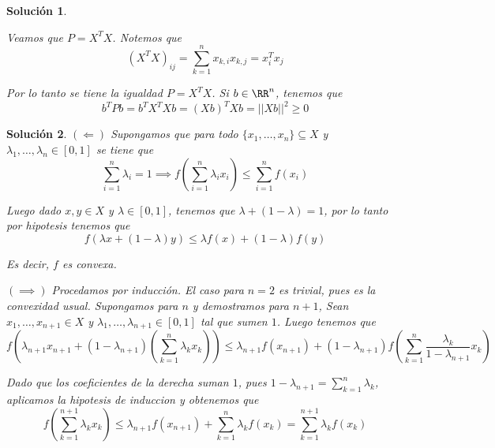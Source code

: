 \documentclass[a4paper,oneside,10.5pt]{USMArt}
\newtheorem{sol}{Soluci\'on}
\begin{document}
\begin{sol}
\begin{enumerate}
          Veamos que $P = X^TX$. Notemos que
          \begin{equation*}
            (X^{T}X)_{ij} = \sum_{k = 1}^n x_{k,i} x_{k,j} = x_{i}^T x_j
          \end{equation*}

          Por lo tanto se tiene la igualdad $P = X^TX$. Si $b \in \RR^n$, tenemos que
          \begin{equation*}
            b^TPb = b^TX^TXb =(Xb)^TXb = ||Xb||^2 \geq 0
          \end{equation*}
  \end{enumerate}
\end{sol}

\begin{sol}
  $(\Leftarrow)$ Supongamos que para todo $\{x_{1}, \dots, x_{n}\} \subseteq X$ y $\lambda_{1}, \dots, \lambda_{n} \in [0, 1]$ se tiene que
  \begin{equation*}
    \sum_{i = 1}^{n} \lambda_{i} = 1 \implies f(\sum_{i = 1}^{n} \lambda_{i} x_{i}) \leq \sum_{i = 1}^{n} f(x_{i})
  \end{equation*}

  Luego dado $x, y \in X$ y $\lambda \in [0,1]$, tenemos que $\lambda + (1 - \lambda) = 1$, por lo tanto por hipotesis
  tenemos que
  \begin{equation*}
    f(\lambda x + (1 - \lambda) y) \leq \lambda f(x) + (1 - \lambda) f(y)
  \end{equation*}

  Es decir, $f$ es convexa.

  $(\implies)$ Procedamos por inducción. El caso para $n = 2$ es trivial, pues es la convexidad usual. Supongamos para
  $n$ y demostramos para $n + 1$, Sean $x_{1}, \dots, x_{n + 1} \in X$ y $\lambda_{1}, \dots, \lambda_{n + 1} \in [0, 1]$
  tal que sumen $1$. Luego tenemos que
  \begin{equation*}
    f(\lambda_{n + 1} x_{n +1} + (1 - \lambda_{n + 1})(\sum_{k = 1}^{n} \lambda_{k} x_{k})) \leq \lambda_{n + 1}f(x_{n+1}) + (1 - \lambda_{n + 1}) f(\sum_{k = 1}^{n} \frac{\lambda_{k}}{1 - \lambda_{n + 1}} x_{k})
  \end{equation*}

  Dado que los coeficientes de la derecha suman $1$, pues $1 - \lambda_{n + 1} = \sum_{k = 1}^n \lambda_k$, aplicamos la hipotesis de induccion y obtenemos que
  \begin{equation*}
    f(\sum_{k = 1}^{n + 1} \lambda_k x_k) \leq \lambda_{n + 1} f(x_{n + 1}) + \sum_{k = 1}^n \lambda_k f(x_k) =  \sum_{k = 1}^{n + 1} \lambda_k f(x_k)
  \end{equation*}
\end{sol}
\end{document}
